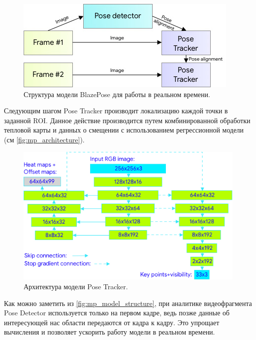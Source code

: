 \begin{figure}[h]
	\centering
	\includegraphics[width=\textwidth * 4 / 5]{./images/MPPose/Model_structure.jpg}
	\caption{Структура модели BlazePose для работы в реальном времени. \cite{BlazePose}}
	\label{fig:mp_model_structure}
\end{figure}

Следующим шагом Pose Tracker производит локализацию каждой точки в заданной ROI. Данное действие производится путем комбинированной обработки тепловой карты и данных о смещении с использованием регрессионной модели (см \autoref{fig:mp_architecture}).

\begin{figure}[h]
	\centering
	\includegraphics[width=\textwidth * 4 / 5]{./images/MPPose/architecture.jpg}
	\caption{Архитектура модели Pose Tracker. \cite{BlazePose}}
	\label{fig:mp_architecture}
\end{figure}

Как можно заметить из \autoref{fig:mp_model_structure}, при аналитике видеофрагмента Pose Detector используется только на первом кадре, ведь позже данные об интересующей нас области передаются от кадра к кадру. Это упрощает вычисления и позволяет ускорить работу модели в реальном времени.

